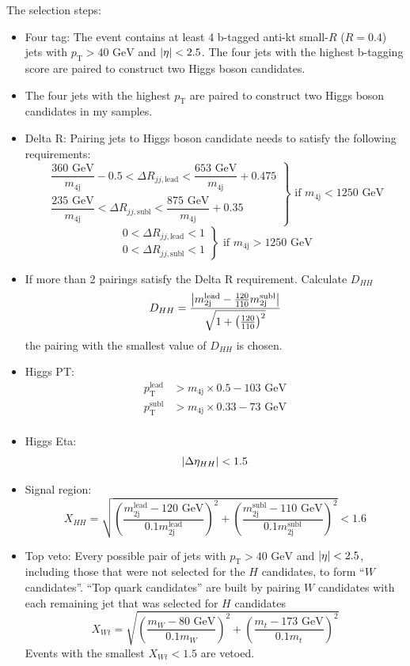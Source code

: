 \documentclass[12pt]{article}
\begin{document}
			The selection steps:
			\begin{itemize}
			\item Four tag: The event contains at least 4 b-tagged anti-kt small-$R$ ($R = 0.4$) jets with $p_\text{T} > \text{40 GeV}$ and $\abs{\eta} < 2.5$. The four jets with the highest b-tagging score are paired to construct two Higgs boson candidates.
			\item The four jets with the highest $p_\text{T}$ are paired to construct two Higgs boson candidates in my samples.
			\item Delta R: Pairing jets to Higgs boson candidate needs to satisfy the following requirements:
			\[
				\left.
				\begin{array}{c}
					\dfrac{\text{360 GeV}}{m_\text{4j}} - 0.5 < \Delta R_{jj,\text{lead}} < \dfrac{\text{653 GeV}}{m_{\text{4j}}} + 0.475 \\
					\dfrac{\text{235 GeV}}{m_\text{4j}}  < \Delta R_{jj,\text{subl}} < \dfrac{\text{875 GeV}}{m_{\text{4j}}} + 0.35 
				\end{array} 
				\right\} \text{ if } m_{\text{4j}} <  \text{1250 GeV}
			\] 
			\[
				\left.
				\begin{array}{c}
					0 < \Delta R_{jj,\text{lead}} < 1 \\
					0 < \Delta R_{jj,\text{subl}} < 1 
				\end{array} 
				\right\} \text{ if } m_{\text{4j}} >  \text{1250 GeV}
			\] 
			\item If more than 2 pairings satisfy the Delta R requirement. Calculate $D_{HH}$
			\[
				D_{HH} = \frac{\abs{m_{\text{2j}}^{\text{lead}} - \frac{120}{110} m_{\text{2j}}^{\text{subl}}}}{\sqrt{1 + \left( \frac{120}{110} \right)^2}}
			\] 
			the pairing with the smallest value of $D_{HH}$ is chosen.
			\item Higgs PT: 
			\begin{align*}
				p_{\text{T}}^{\text{lead}} &> m_{\text{4j}} \times 0.5 - \text{103 GeV} \\
				p_{\text{T}}^{\text{subl}} &> m_{\text{4j}} \times 0.33 - \text{73 GeV} \\
			\end{align*}
			\item Higgs Eta: 
			\[
				\abs{\Delta\eta_{HH}} < 1.5
			\] 
			\item Signal region:
			\[
				X_{HH} = \sqrt{\left( \frac{m_{\text{2j}}^{\text{lead}} - \text{120 GeV}}{0.1 m_{\text{2j}}^{\text{lead}}} \right)^2 + \left(\frac{m_{\text{2j}}^{\text{subl}} - \text{110 GeV}}{0.1 m_{\text{2j}}^{\text{subl}}} \right)^2} < 1.6
			\]
			\item Top veto: Every possible pair of jets with $p_\text{T} > \text{40 GeV}$ and $\abs{\eta} < 2.5$, including those that were not selected for the $H$ candidates, to form ``$W$ candidates''. ``Top quark candidates'' are built by pairing $W$ candidates with each remaining jet that was selected for $H$ candidates
			\[
				X_{Wt} = \sqrt{\left( \frac{m_{W} - \text{80 GeV}}{0.1 m_{W}} \right)^2 + \left(\frac{m_{t} - \text{173 GeV}}{0.1 m_{t}} \right)^2} 
			\] 
			Events with the smallest $X_{Wt} < 1.5$ are vetoed.

			\end{itemize}
\end{document}
